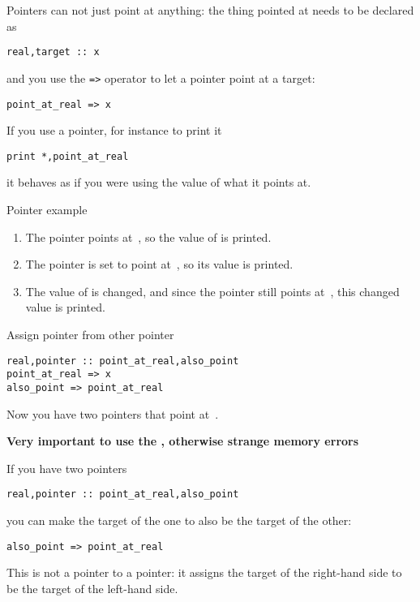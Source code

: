Pointers can not just point at anything: the thing pointed at needs to
be declared as 
\begin{verbatim}
real,target :: x
\end{verbatim}
and you use the \verb+=>+ operator to let a pointer point at a target:
\begin{verbatim}
point_at_real => x
\end{verbatim}

If you use a pointer, for instance to print it
\begin{verbatim}
print *,point_at_real
\end{verbatim}
it behaves as if you were using the value of what it points at.

\begin{block}{Pointer example}
  \label{sl:fpoint-ex}
  \begin{enumerate}
  \item The pointer points at~, so the value of  is printed.
  \item The pointer is set to point at~, so its value is printed.
  \item The value of  is changed, and since the pointer still
    points at~, this changed value is printed.
  \end{enumerate}
\end{block}

\begin{block}{Assign pointer from other pointer}
  \label{sl:fpoint-copy}
\begin{verbatim}
real,pointer :: point_at_real,also_point
point_at_real => x
also_point => point_at_real  
\end{verbatim}
  Now you have two pointers that point at~.

  \textbf{Very important to use the \n{=>}, otherwise strange
    memory errors}
\end{block}

If you have two pointers
\begin{verbatim}
real,pointer :: point_at_real,also_point
\end{verbatim}
you can make the target of the one to also be the target of the other:
\begin{verbatim}
also_point => point_at_real  
\end{verbatim}
This is not a pointer to a pointer: it assigns the target of the
right-hand side to be the target of the left-hand side.

